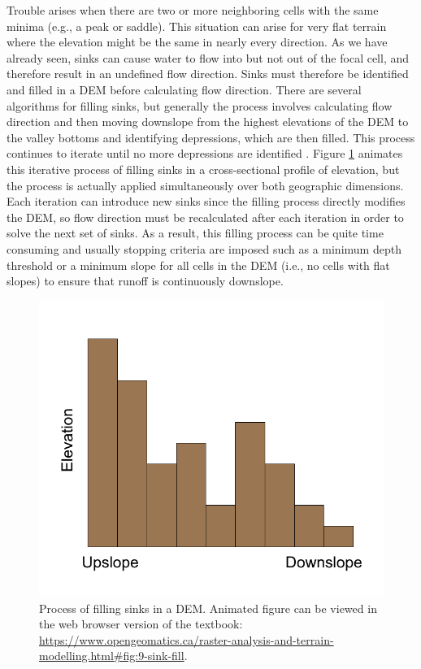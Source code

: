 \documentclass[
]{book}
\begin{document}
Trouble arises when there are two or more neighboring cells with the same minima (e.g., a peak or saddle). This situation can arise for very flat terrain where the elevation might be the same in nearly every direction. As we have already seen, sinks can cause water to flow into but not out of the focal cell, and therefore result in an undefined flow direction. Sinks must therefore be identified and filled in a DEM before calculating flow direction. There are several algorithms for filling sinks, but generally the process involves calculating flow direction and then moving downslope from the highest elevations of the DEM to the valley bottoms and identifying depressions, which are then filled. This process continues to iterate until no more depressions are identified \citep{marks_automated_1984}. Figure \ref{fig:9-sink-fill} animates this iterative process of filling sinks in a cross-sectional profile of elevation, but the process is actually applied simultaneously over both geographic dimensions. Each iteration can introduce new sinks since the filling process directly modifies the DEM, so flow direction must be recalculated after each iteration in order to solve the next set of sinks. As a result, this filling process can be quite time consuming and usually stopping criteria are imposed such as a minimum depth threshold or a minimum slope for all cells in the DEM (i.e., no cells with flat slopes) to ensure that runoff is continuously downslope.



\begin{figure}
\includegraphics[width=0.75\linewidth]{images/09-sink-fill-static} \caption{Process of filling sinks in a DEM. Animated figure can be viewed in the web browser version of the textbook: \url{https://www.opengeomatics.ca/raster-analysis-and-terrain-modelling.html\#fig:9-sink-fill}.}\label{fig:9-sink-fill}
\end{figure}
\end{document}
